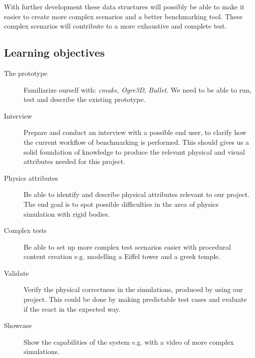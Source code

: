 \documentclass[a4paper, 10pt]{article}
\begin{document}
With further development these data structures will possibly be able to make it easier to create more complex scenarios
and a better benchmarking tool. These complex scenarios will contribute to a more exhaustive and complete test.
\subsection*{Learning objectives}
\begin{description}
\item[The prototype] 	Familiarize ourself with: \emph{cmake}, \emph{Ogre3D}, \emph{Bullet}. 
			We need to be able to run, test and describe the existing prototype.
\item[Interview] Prepare and conduct an interview with a possible end user, to clarify how the current workflow of benchmarking is performed.
		 This should gives us a solid foundation of knowledge to produce the relevant physical and visual attributes needed for this project. 
\item[Physics attributes]Be able to identify and describe physical attributes relevant to our project. The end goal is to spot possible difficulties in the
			area of physics simulation with rigid bodies.
\item[Complex tests] Be able to set up more complex test scenarios easier with procedural content creation e.g. modelling a Eiffel tower and a
			greek temple.
\item[Validate] Verify the physical correctness in the simulations, produced by using our project. 
		This could be done by making predictable test cases and evaluate if the react in the expected way. 
\item[Showcase] Show the capabilities of the system e.g. with a video of more complex simulations.
\end{description}
\end{document}

